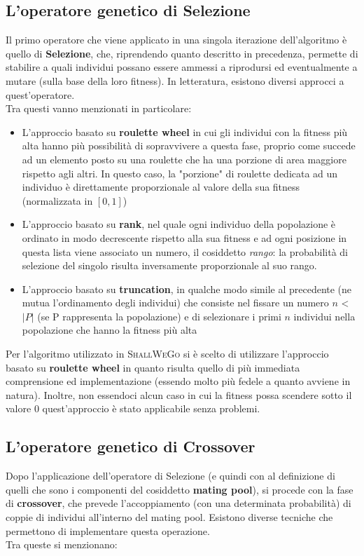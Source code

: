     \subsection{L'operatore genetico di Selezione}
        Il primo operatore che viene applicato in una singola iterazione dell'algoritmo è quello di \textbf{Selezione}, che, riprendendo quanto descritto in precedenza, permette di stabilire a quali individui possano essere ammessi a riprodursi ed eventualmente a mutare (sulla base della loro fitness). In letteratura, esistono diversi approcci a quest'operatore. \\
        Tra questi vanno menzionati in particolare:

        \begin{itemize}
            \item L'approccio basato su \textbf{roulette wheel} in cui gli individui con la fitness più alta hanno più possibilità di sopravvivere a questa fase, proprio come succede ad un elemento posto su una roulette che ha una porzione di area maggiore rispetto agli altri. In questo caso, la "porzione" di roulette dedicata ad un individuo è direttamente proporzionale al valore della sua fitness (normalizzata in $[0, 1]$)
            \item L'approccio basato su \textbf{rank}, nel quale ogni individuo della popolazione è ordinato in modo decrescente rispetto alla sua fitness e ad ogni posizione in questa lista viene associato un numero, il cosiddetto \textit{rango}: la probabilità di selezione del singolo risulta inversamente proporzionale al suo rango.
            \item L'approccio basato su \textbf{truncation}, in qualche modo simile al precedente (ne mutua l'ordinamento degli individui) che consiste nel fissare un numero $n$ < $|P|$ (se P rappresenta la popolazione) e di selezionare i primi $n$ individui nella popolazione che hanno la fitness più alta
        \end{itemize}

        Per l'algoritmo utilizzato in \textsc{ShallWeGo} si è scelto di utilizzare l'approccio basato su \textbf{roulette wheel} in quanto risulta quello di più immediata comprensione ed implementazione (essendo molto più fedele a quanto avviene in natura). Inoltre, non essendoci alcun caso in cui la fitness possa scendere sotto il valore $0$ quest'approccio è stato applicabile senza problemi.

    \subsection{L'operatore genetico di Crossover}
        Dopo l'applicazione dell'operatore di Selezione (e quindi con al definizione di quelli che sono i componenti del cosiddetto \textbf{mating pool}), si procede con la fase di \textbf{crossover}, che prevede l'accoppiamento (con una determinata probabilità) di coppie di individui all'interno del mating pool. 
        Esistono diverse tecniche che permettono di implementare questa operazione. \\
        Tra queste si menzionano: \cite{}

